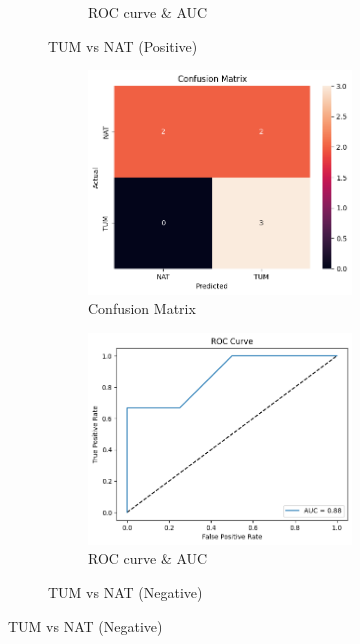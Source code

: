 \documentclass[a4paper,12pt]{article}
\begin{document}
\begin{figure}[H]
\begin{subfigure}[b]{0.45\textwidth}
\begin{subfigure}[b]{0.49\textwidth}
			\caption{ROC curve \& AUC}
			\label{fig:fig2}
		\end{subfigure}
		\caption{TUM vs NAT (Positive)}
		\label{subfig:1}
	\end{subfigure}
	\hfill
	\begin{subfigure}[b]{0.45\textwidth}
		\centering
		\begin{subfigure}[b]{0.49\textwidth}
			\centering
			\includegraphics[width=\textwidth]{images/2nrc.png}  %
			\caption{Confusion Matrix}
			\label{fig:fig3}
		\end{subfigure}
		\hfill
		\begin{subfigure}[b]{0.49\textwidth}
			\centering
			\includegraphics[width=\textwidth]{images/2nrr.png}  %
			\caption{ROC curve \& AUC}
			\label{fig:fig4}
		\end{subfigure}
		\caption{TUM vs NAT (Negative)}
		\label{subfig:2}
	\end{subfigure}


\end{figure}
\end{document}

